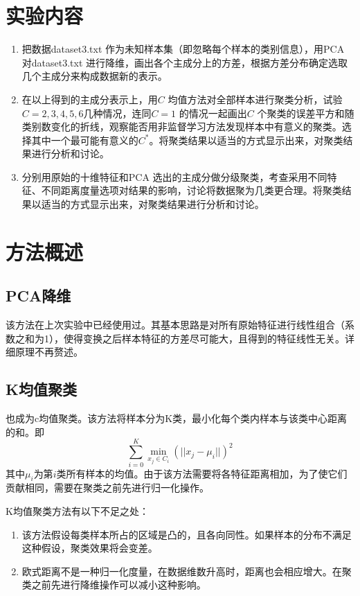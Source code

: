 \tableofcontents
\clearpage


\section{实验内容}
\begin{enumerate}
\item 把数据{\ttfamily dataset3.txt} 作为未知样本集（即忽略每个样本的类别信息），用{\ttfamily PCA} 对{\ttfamily dataset3.txt} 进行降维，画出各个主成分上的方差，根据方差分布确定选取几个主成分来构成数据新的表示。
\item 在以上得到的主成分表示上，用$C$ 均值方法对全部样本进行聚类分析，试验$C=2,3,4,5,6 $几种情况，连同$C=1$ 的情况一起画出$C$ 个聚类的误差平方和随类别数变化的折线，观察能否用非监督学习方法发现样本中有意义的聚类。选择其中一个最可能有意义的$C^*$。将聚类结果以适当的方式显示出来，对聚类结果进行分析和讨论。
\item 分别用原始的十维特征和{\ttfamily PCA} 选出的主成分做分级聚类，考查采用不同特征、不同距离度量选项对结果的影响，讨论将数据聚为几类更合理。将聚类结果以适当的方式显示出来，对聚类结果进行分析和讨论。
\end{enumerate}

\section{方法概述}
\subsection{PCA降维}
该方法在上次实验中已经使用过。其基本思路是对所有原始特征进行线性组合（系数之和为1），使得变换之后样本特征的方差尽可能大，且得到的特征线性无关。详细原理不再赘述。

\subsection{K均值聚类}
也成为c均值聚类。该方法将样本分为K类，最小化每个类内样本与该类中心距离的和。即
\begin{equation}
\sum_{i=0}^{K}\min_{x_j\in C_i}(||x_j-\mu_i||)^2
\end{equation}
其中$\mu_i$为第$i$类所有样本的均值。由于该方法需要将各特征距离相加，为了使它们贡献相同，需要在聚类之前先进行归一化操作。

K均值聚类方法有以下不足之处：
\begin{enumerate}
\item 该方法假设每类样本所占的区域是凸的，且各向同性。如果样本的分布不满足这种假设，聚类效果将会变差。
\item 欧式距离不是一种归一化度量，在数据维数升高时，距离也会相应增大。在聚类之前先进行降维操作可以减小这种影响。
\end{enumerate}

